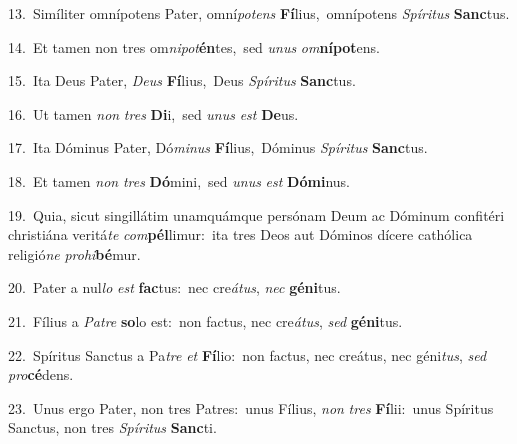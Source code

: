 {\numbfont\textcolor{\numbcolor}{13.}}~Simíliter omnípotens Pater, omní\-\textit{pot}\-\textit{ens} \textbf{Fí}\-lius,~\star omnípotens \textit{Spí}\-\textit{ri}\textit{tus} \textbf{Sanc}\-tus.\par
{\numbfont\textcolor{\numbcolor}{14.}}~Et tamen non tres om\-\textit{ni}\-\textit{pot}\textbf{én}tes,~\star sed \textit{u}\-\textit{nus} \textit{om}\-\textbf{ní}\textbf{pot}ens.\par
{\numbfont\textcolor{\numbcolor}{15.}}~Ita Deus Pater, \textit{De}\-\textit{us} \textbf{Fí}\-lius,~\star Deus \textit{Spí}\-\textit{ri}\textit{tus} \textbf{Sanc}\-tus.\par
{\numbfont\textcolor{\numbcolor}{16.}}~Ut tamen \textit{non} \textit{tres} \textbf{Di}\-i,~\star sed \textit{u}\-\textit{nus} \textit{est} \textbf{De}\-us.\par
{\numbfont\textcolor{\numbcolor}{17.}}~Ita Dóminus Pater, Dó\-\textit{mi}\-\textit{nus} \textbf{Fí}\-lius,~\star Dóminus \textit{Spí}\-\textit{ri}\textit{tus} \textbf{Sanc}\-tus.\par
{\numbfont\textcolor{\numbcolor}{18.}}~Et tamen \textit{non} \textit{tres} \textbf{Dó}\-mini,~\star sed \textit{u}\-\textit{nus} \textit{est} \textbf{Dó}\-\textbf{mi}nus.\par
{\numbfont\textcolor{\numbcolor}{19.}}~Quia, sicut singillátim unamquámque persónam Deum ac Dóminum confitéri christiána veritá\textit{te} \textit{com}\-\textbf{pél}limur:~\star ita tres Deos aut Dóminos dícere cathólica religió\textit{ne} \textit{pro}\-\textit{hi}\textbf{bé}mur.\par
{\numbfont\textcolor{\numbcolor}{20.}}~Pater a nul\textit{lo} \textit{est} \textbf{fac}\-tus:~\star nec cre\-\textit{á}\-\textit{tus}, \textit{nec} \textbf{gé}\-\textbf{ni}tus.\par
{\numbfont\textcolor{\numbcolor}{21.}}~Fílius a \textit{Pa}\-\textit{tre} \textbf{so}\-lo est:~\star non factus, nec cre\-\textit{á}\-\textit{tus}, \textit{sed} \textbf{gé}\-\textbf{ni}tus.\par
{\numbfont\textcolor{\numbcolor}{22.}}~Spíritus Sanctus a Pa\textit{tre} \textit{et} \textbf{Fí}\-lio:~\star non factus, nec creátus, nec géni\-\textit{tus}\-, \textit{sed} \textit{pro}\-\textbf{cé}dens.\par
{\numbfont\textcolor{\numbcolor}{23.}}~Unus ergo Pater, non tres Patres:~\dagger unus Fílius, \textit{non} \textit{tres} \textbf{Fí}\-lii:~\star unus Spíritus Sanctus, non tres \textit{Spí}\-\textit{ri}\textit{tus} \textbf{Sanc}\-ti.\par

